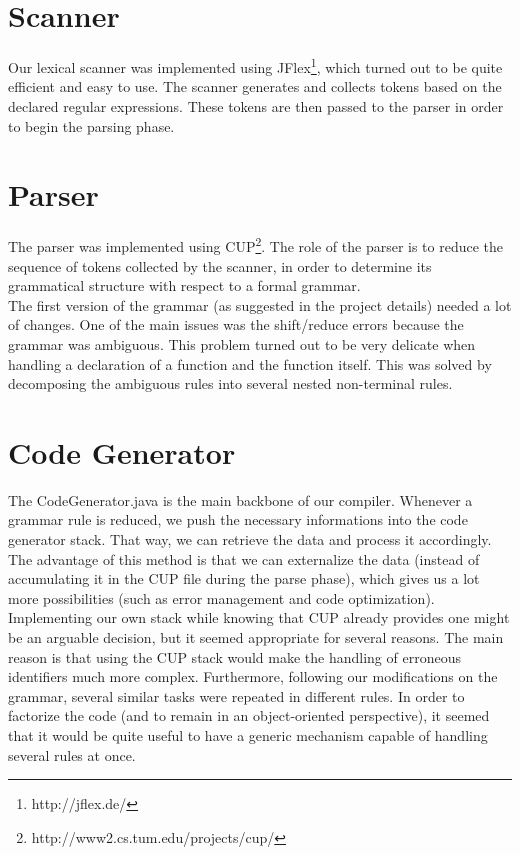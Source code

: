 \documentclass{scrartcl}
\begin{document}
\section{Scanner}
Our lexical scanner was implemented using JFlex\footnote{http://jflex.de/}, which turned out to be quite efficient and easy to use. The scanner generates and collects tokens based on the declared regular expressions. These tokens are then passed to the parser in order to begin the parsing phase.

\section{Parser}
The parser was implemented using CUP\footnote{http://www2.cs.tum.edu/projects/cup/}. The role of the parser is to reduce the sequence of tokens collected by the scanner, in order to determine its grammatical structure with respect to a formal grammar.\\
The first version of the grammar (as suggested in the project details) needed a lot of changes. One of the main issues was the shift/reduce errors because the grammar was ambiguous. This problem turned out to be very delicate when handling a declaration of a function and the function itself. This was solved by decomposing the ambiguous rules into several nested non-terminal rules.

\section{Code Generator}
The CodeGenerator.java is the main backbone of our compiler. Whenever a grammar rule is reduced, we push the necessary informations into the code generator stack. That way, we can retrieve the data and process it accordingly. The advantage of this method is that we can externalize the data (instead of accumulating it in the CUP file during the parse phase), which gives us a lot more possibilities (such as error management and code optimization).\\

Implementing our own stack while knowing that CUP already provides one might be an arguable decision, but it seemed appropriate for several reasons. The main reason is that using the CUP stack would make the handling of erroneous identifiers much more complex. Furthermore, following our modifications on the grammar, several similar tasks were repeated in different rules. In order to factorize the code (and to remain in an object-oriented perspective), it seemed that it would be quite useful to have a generic mechanism capable of handling several rules at once.\\
\end{document}
